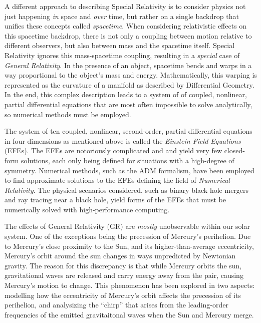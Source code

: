 \documentclass{report}
\begin{document}
    A different approach to describing Special Relativity is to consider physics not just happening \textit{in} space and \textit{over} time, but rather on a single backdrop that unifies these concepts called \emph{spacetime}.  When considering relativistic effects on this spacetime backdrop, there is not only a coupling between motion relative to different observers, but also between mass and the spacetime itself.  Special Relativity ignores this mass-spacetime coupling, resulting in a \textit{special} case of \emph{General Relativity}.  In the presence of an object, spacetime bends and warps in a way proportional to the object's mass and energy.  Mathematically, this warping is represented as the curvature of a manifold as described by Differential Geometry.  In the end, this complex description leads to a system of of coupled, nonlinear, partial differential equations that are most often impossible to solve analytically, so numerical methods must be employed.

    The system of ten coupled, nonlinear, second-order, partial differential equations in four dimensions\cite{443754} as mentioned above is called the \emph{Einstein Field Equations} (EFEs).  The EFEs are notoriously complicated and and yield very few closed-form solutions\cite{misner2017gravitation}, each only being defined for situations with a high-degree of symmetry.  Numerical methods, such as the ADM formalism\cite{Arnowitt_2008}, have been employed to find approximate solutions to the EFEs defining the field of \emph{Numerical Relativity}.  The physical scenarios considered, such as binary black hole mergers\cite{blackholemerger} and ray tracing near a black hole\cite{James_2015}, yield forms of the EFEs that must be numerically solved with high-performance computing\cite{li2023solving,Andrade2021,Clough_2015}.

\newpage

    The effects of General Relativity (GR) are \emph{mostly} unobservable within our solar system.  One of the exceptions being the precession of Mercury's perihelion.  Due to Mercury's close proximity to the Sun, and its higher-than-average eccentricity, Mercury's orbit around the sun changes in ways unpredicted by Newtonian gravity.  The reason for this discrepancy is that while Mercury orbits the sun, gravitational waves are released and carry energy away from the pair, causing Mercury's motion to change.  This phenomenon has been explored in two aspects: modelling how the eccentricity of Mercury's orbit affects the precession of its perihelion\cite{Chapman2019}, and analysizing the ``chirp'' that arises from the leading-order frequencies of the emitted gravitaitonal waves when the Sun and Mercury merge\cite{Chapman2022}.
\end{document}
